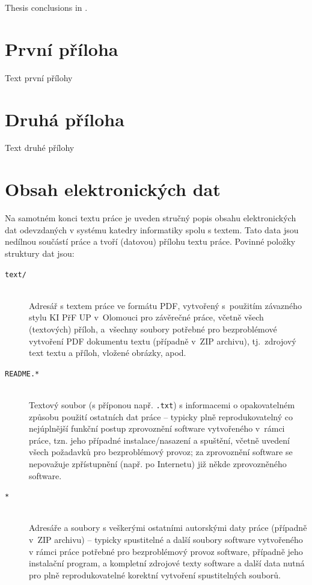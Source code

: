 \documentclass[
  master,
  program=ainf,
  tables=false,
  sourcecodes,
  glossaries,
  index
]{kidiplom}
\begin{document}
\begin{kiconclusions}[english]
  Thesis conclusions in .
\end{kiconclusions}

\appendix

\section{První příloha}
Text první přílohy

\section{Druhá příloha}
Text druhé přílohy

\section{Obsah elektronických dat} \label{sec:ObsahData}

Na samotném konci textu práce je uveden stručný popis obsahu
elektronických dat odevzdaných v systému katedry informatiky spolu s
textem. Tato data jsou nedílnou součástí práce a tvoří (datovou)
přílohu textu práce. Povinné položky struktury dat jsou:

\begin{description}

  \item[\texttt{text/}] \hfill \\
    Adresář s textem práce ve formátu PDF, vytvořený s~použitím
    závazného stylu KI PřF UP v~Olomouci pro závěrečné práce, včetně
    všech (textových) příloh, a~všechny soubory potřebné pro
    bezproblémové vytvoření PDF dokumentu textu (případně v~ZIP
    archivu), tj.~zdrojový text textu a příloh, vložené obrázky, apod.

  \item[\texttt{README.*}] \hfill \\
    Textový soubor (s příponou např. \texttt{.txt}) s informacemi o
    opakovatelném způsobu použití ostatních dat práce -- typicky plně
    reprodukovatelný co nejúplnější funkční postup zprovoznění software
    vytvořeného v~rámci práce, tzn. jeho případné instalace/nasazení a
    spuštění, včetně uvedení všech požadavků pro bezproblémový provoz;
    za zprovoznění software se nepovažuje zpřístupnění (např. po
    Internetu) již někde zprovozněného software.

  \item[\texttt{*}] \hfill \\
    Adresáře a soubory s veškerými ostatními autorskými daty práce
    (případně v~ZIP archivu) -- typicky spustitelné a další soubory
    software vytvořeného v rámci práce potřebné pro bezproblémový provoz
    software, případně jeho instalační program, a kompletní zdrojové
    texty software a další data nutná pro plně reprodukovatelné korektní
    vytvoření spustitelných souborů.

\end{description}
\end{document}

